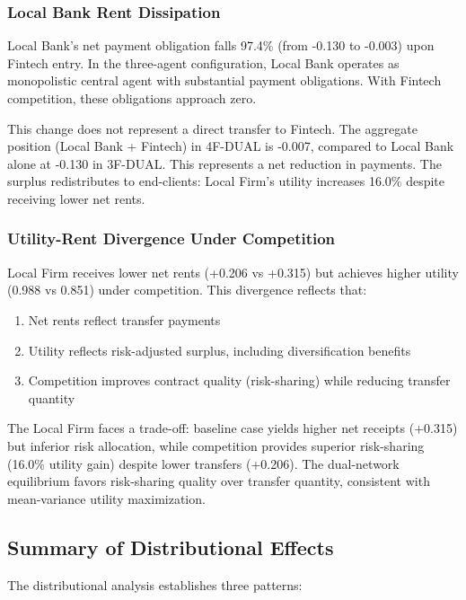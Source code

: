 \subsubsection{Local Bank Rent Dissipation}

Local Bank's net payment obligation falls 97.4\% (from -0.130 to -0.003) upon Fintech entry. In the three-agent configuration, Local Bank operates as monopolistic central agent with substantial payment obligations. With Fintech competition, these obligations approach zero.

This change does not represent a direct transfer to Fintech. The aggregate position (Local Bank + Fintech) in 4F-DUAL is -0.007, compared to Local Bank alone at -0.130 in 3F-DUAL. This represents a net reduction in payments. The surplus redistributes to end-clients: Local Firm's utility increases 16.0\% despite receiving lower net rents.

\subsubsection{Utility-Rent Divergence Under Competition}

Local Firm receives lower net rents (+0.206 vs +0.315) but achieves higher utility (0.988 vs 0.851) under competition. This divergence reflects that:

\begin{enumerate}
    \item Net rents reflect transfer payments
    \item Utility reflects risk-adjusted surplus, including diversification benefits
    \item Competition improves contract quality (risk-sharing) while reducing transfer quantity
\end{enumerate}

The Local Firm faces a trade-off: baseline case yields higher net receipts (+0.315) but inferior risk allocation, while competition provides superior risk-sharing (16.0\% utility gain) despite lower transfers (+0.206). The dual-network equilibrium favors risk-sharing quality over transfer quantity, consistent with mean-variance utility maximization.

\subsection{Summary of Distributional Effects}

The distributional analysis establishes three patterns:

